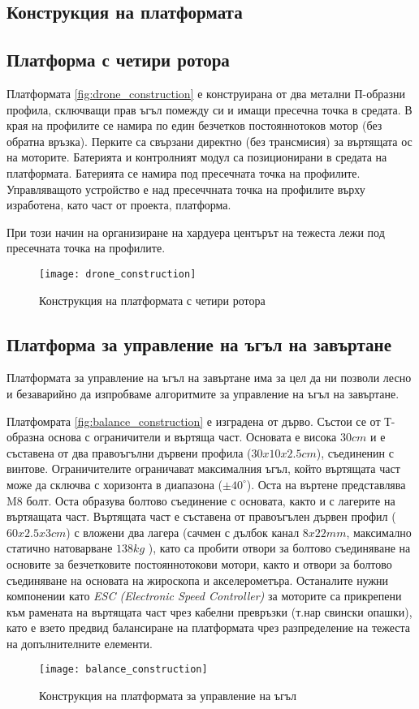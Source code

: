 \subsection{Конструкция на платформата}

\subsection{Платформа с четири ротора}
\FloatBarrier

Платформата \autoref{fig:drone_construction} е конструирана от два метални П-образни профила, сключващи прав ъгъл помежду си и имащи пресечна точка в средата.
В края на профилите се намира по един безчетков постояннотоков мотор (без обратна връзка).
Перките са свързани директно (без трансмисия) за въртящата ос на моторите.
Батерията и контролният модул са позиционирани в средата на платформата.
Батерията се намира под пресечната точка на профилите.
Управляващото устройство е над пресеччната точка на профилите
върху изработена, като част от проекта, платформа.

При този начин на организиране на хардуера центърът на тежеста лежи под пресечната точка на профилите.


\begin{figure}[htpb!]
    \centering
    \texttt{[image: drone\_construction]}
    \caption{Конструкция на платформата с четири ротора}
    \label{fig:drone_construction}
\end{figure}



\FloatBarrier
\subsection{Платформа за управление на ъгъл на завъртане}
\FloatBarrier

Платформата за управление на ъгъл на завъртане има за цел да ни позволи лесно и безаварийно да изпробваме алгоритмите за управление на ъгъл на завъртане.

Платфомрата \autoref{fig:balance_construction} е изградена от дърво.
Състои се от Т-образна основа с ограничители и въртяща част.
Основата е висока \(30cm\) и е съставена от два правоъгълни дървени профила (\(30x10x2.5cm\)), съединенин с винтове. 
Ограничителите ограничават максималния ъгъл, който въртящата част може да сключва с хоризонта в диапазона (\(\pm 40^{\circ}\)).
Оста на въртене представлява M8 болт.
Оста образува болтово съединение с основата, както и с лагерите на въртяащата част.
Въртящата част е съставена от правоъгълен дървен профил (\(60x2.5x3cm\)) с вложени два лагера 
(сачмен с дълбок канал \(8x22mm\), максимално статично натоварване \(138kg\) \cite{datasheet_bearing}),
като са пробити отвори за болтово съединяване на основите за безчетковите постояннотокови мотори,
както и отвори за болтово съединяване на основата на жироскопа и акселерометъра.
Останалите нужни компонении като \textit{ESC (Electronic Speed Controller)} за моторите са прикрепени към рамената на въртящата
част чрез кабелни превръзки (т.нар свински опашки), като е взето предвид балансиране на платформата
чрез разпределение на тежеста на допълнителните елементи.

\begin{figure}[htpb!]
    \centering
    \texttt{[image: balance\_construction]}
    \caption{Конструкция на платформата за управление на ъгъл}
    \label{fig:balance_construction}
\end{figure}

\FloatBarrier

